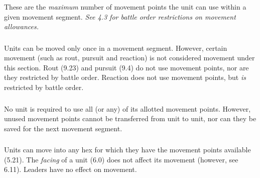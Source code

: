 These are the \textit{maximum} number of movement points the unit can use within a given movement segment. \textit{See 4.3 for battle order restrictions on movement allowances.}

\subsubsection[Movement Limits]{} Units can be moved only once in a movement segment. However, certain movement (such as rout, pursuit and reaction) is not considered movement under this section. Rout (9.23) and pursuit (9.4) do not use movement points, nor are they restricted by battle order. Reaction does not use movement points, but \textit{is} restricted by battle order.

\subsubsection[Movement Point Use]{} No unit is required to use all (or any) of its allotted movement points. However, unused movement points cannot be transferred from unit to unit, nor can they be saved for the next movement segment.

\subsubsection[Movement and Facing]{} Units can move into any hex for which they have the movement points available (5.21). The \textit{facing} of a unit (6.0) does not affect its movement (however, see 6.11). Leaders have no effect on movement.